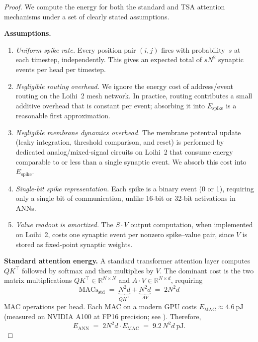 \documentclass{article}
\begin{document}
\begin{proof}
We compute the energy for both the standard and TSA attention mechanisms
under a set of clearly stated assumptions.

\medskip
\noindent\textbf{Assumptions.}
\begin{enumerate}[A1.]
  \item \textit{Uniform spike rate.}
    Every position pair $(i,j)$ fires with probability~$s$ at each
    timestep, independently.  This gives an expected total of
    $s N^2$ synaptic events per head per timestep.
  \item \textit{Negligible routing overhead.}
    We ignore the energy cost of address/event routing on the Loihi~2
    mesh network.  In practice, routing contributes a small additive
    overhead that is constant per event; absorbing it into
    $E_{\mathrm{spike}}$ is a reasonable first approximation.
  \item \textit{Negligible membrane dynamics overhead.}
    The membrane potential update (leaky integration, threshold comparison,
    and reset) is performed by dedicated analog/mixed-signal circuits
    on Loihi~2 that consume energy comparable to or less than a single
    synaptic event.  We absorb this cost into $E_{\mathrm{spike}}$.
  \item \textit{Single-bit spike representation.}
    Each spike is a binary event (0 or 1), requiring only a single bit
    of communication, unlike 16-bit or 32-bit activations in ANNs.
  \item \textit{Value readout is amortized.}
    The $S \cdot V$ output computation, when implemented on Loihi~2,
    costs one synaptic event per nonzero spike--value pair, since
    $V$ is stored as fixed-point synaptic weights.
\end{enumerate}

\medskip
\noindent\textbf{Standard attention energy.}
A standard transformer attention layer computes $QK^\top$ followed by
softmax and then multiplies by $V$.  The dominant cost is the two
matrix multiplications $QK^\top \in \mathbb{R}^{N \times N}$ and
$A \cdot V \in \mathbb{R}^{N \times d}$, requiring
\[
  \text{MACs}_{\mathrm{std}}
  \;=\; \underbrace{N^2 d}_{QK^\top} + \underbrace{N^2 d}_{AV}
  \;=\; 2N^2 d
\]
MAC operations per head.
Each MAC on a modern GPU costs
$E_{\mathrm{MAC}} \approx 4.6~\mathrm{pJ}$ (measured on NVIDIA A100
at FP16 precision; see \cite{horowitz2014}).
Therefore,
\[
  E_{\mathrm{ANN}}
  \;=\; 2N^2 d \cdot E_{\mathrm{MAC}}
  \;=\; 9.2 \, N^2 d~\mathrm{pJ}.
\]


\end{proof}
\end{document}
